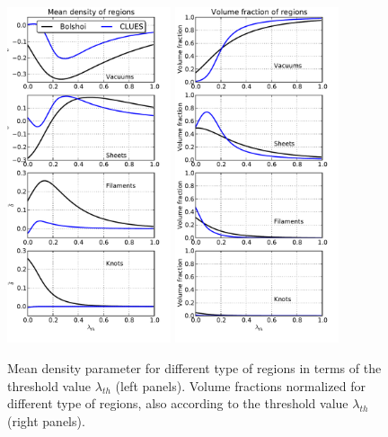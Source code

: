 \newpage
\begin{figure}[htbp]
	\centering
	\includegraphics[width=0.43\textwidth]
	{./figures/4_results/Density_Regions.pdf}
	\includegraphics[width=0.43\textwidth]
	{./figures/4_results/Volume_Regions.pdf}
	
	\caption{\small{Mean density parameter for different type of 
	regions in terms of the thre\-shold value $\lambda_{th}$ (left panels).
	Volume fractions normalized for different type of regions, also 
	according to the threshold value $\lambda_{th}$ (right panels).}}
	\label{fig:Vol_Fraction}
\end{figure}


